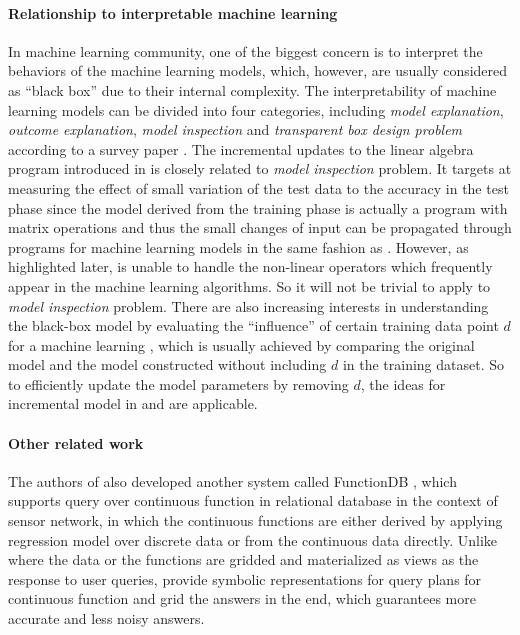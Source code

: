 \paragraph{Relationship to interpretable machine learning} In machine learning community, one of the biggest concern is to interpret the behaviors of the machine learning models, which, however, are usually considered as ``black box'' due to their internal complexity. The interpretability of machine learning models can be divided into four categories, including {\em model explanation}, {\em outcome explanation}, {\em model inspection} and {\em transparent box design problem} according to a survey paper \cite{guidotti2018survey}. The incremental updates to the linear algebra program introduced in \cite{nikolic2014linview} is closely related to {\em model inspection} problem. It targets at measuring the effect of small variation of the test data to the accuracy in the test phase since the model derived from the training phase is actually a program with matrix operations and thus the small changes of input can be propagated through programs for machine learning models in the same fashion as \cite{nikolic2014linview}. However, as highlighted later, \cite{nikolic2014linview} is unable to handle the non-linear operators which frequently appear in the machine learning algorithms. So it will not be trivial to apply \cite{nikolic2014linview} to {\em model inspection} problem. There are also increasing interests in understanding the black-box model by evaluating the ``influence'' of certain training data point $d$ for a machine learning \cite{koh2017understanding}, which is usually achieved by comparing the original model and the model constructed without including $d$ in the training dataset. So to efficiently update the model parameters by removing $d$, the ideas for incremental model in \cite{gupta2015processing} and \cite{deshpande2006mauvedb} are applicable.

\paragraph{Other related work} The authors of \cite{deshpande2006mauvedb} also developed another system called FunctionDB \cite{thiagarajan2008querying}, which supports query over continuous function in relational database in the context of sensor network, in which the continuous functions are either derived by applying regression model over discrete data or from the continuous data directly. Unlike \cite{deshpande2006mauvedb} where the data or the functions are gridded and materialized as views as the response to user queries, \cite{thiagarajan2008querying} provide symbolic representations for query plans for continuous function and grid the answers in the end, which guarantees more accurate and less noisy answers.

